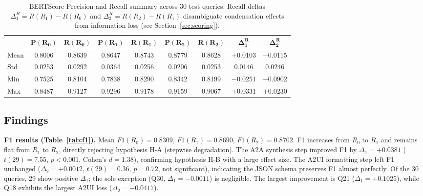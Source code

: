 \documentclass[10pt,journal,compsoc]{IEEEtran}
\begin{document}
\begin{table}[t]
  \caption{BERTScore Precision and Recall summary across 30 test queries.
  Recall deltas $\Delta_1^R = R(R_1) - R(R_0)$ and
  $\Delta_2^R = R(R_2) - R(R_1)$ disambiguate condensation effects from
  information loss (see Section~\ref{sec:scoring}).}
  \label{tab:pr}
  \centering
  \scriptsize
  \setlength{\tabcolsep}{2pt}
  \begin{tabular}{lcccccccc}
    \toprule
    & $\mathbf{P(R_0)}$ & $\mathbf{R(R_0)}$
    & $\mathbf{P(R_1)}$ & $\mathbf{R(R_1)}$
    & $\mathbf{P(R_2)}$ & $\mathbf{R(R_2)}$
    & $\boldsymbol{\Delta_1^R}$ & $\boldsymbol{\Delta_2^R}$ \\
    \midrule
    Mean & 0.8006 & 0.8639 & 0.8647 & 0.8743 & 0.8779 & 0.8628 & $+$0.0103 & $-$0.0115 \\
    Std  & 0.0253 & 0.0292 & 0.0364 & 0.0256 & 0.0206 & 0.0253 & 0.0146  & 0.0246  \\
    Min  & 0.7525 & 0.8104 & 0.7838 & 0.8290 & 0.8342 & 0.8199 & $-$0.0251 & $-$0.0902 \\
    Max  & 0.8487 & 0.9127 & 0.9296 & 0.9178 & 0.9159 & 0.9067 & $+$0.0331 & $+$0.0230 \\
    \bottomrule
  \end{tabular}
\end{table}

\subsection{Findings}
\label{sec:findings}

\noindent\textbf{F1 results (Table~\ref{tab:f1}).}
Mean $F1(R_0) = 0.8309$, $F1(R_1) = 0.8690$, $F1(R_2) = 0.8702$. F1 increases
from $R_0$ to $R_1$ and remains flat from $R_1$ to $R_2$, directly rejecting
hypothesis H-A (stepwise degradation). The A2A synthesis step improved F1 by
$\Delta_1 = +0.0381$ ($t(29)=7.55$, $p<0.001$, Cohen's $d=1.38$), confirming
hypothesis H-B with a large effect size. The A2UI formatting step left F1
unchanged ($\Delta_2 = +0.0012$, $t(29)=0.36$, $p=0.72$, not significant),
indicating the JSON schema preserves F1 almost perfectly. Of the 30 queries,
29 show positive $\Delta_1$; the sole exception (Q30, $\Delta_1 = -0.0011$) is
negligible. The largest improvement is Q21 ($\Delta_1 = +0.1025$), while Q18
exhibits the largest A2UI loss ($\Delta_2 = -0.0417$).
\end{document}
